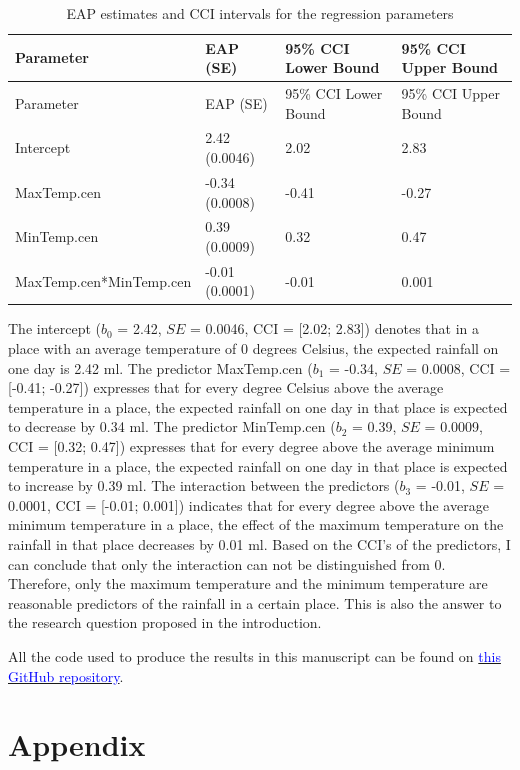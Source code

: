 \documentclass[
]{article}
\begin{document}
\begin{longtable}[]{@{}llll@{}}
\caption{EAP estimates and CCI intervals for the regression
parameters}\tabularnewline
\toprule
Parameter & EAP (SE) & 95\% CCI Lower Bound & 95\% CCI Upper Bound \\
\midrule
\endfirsthead
\toprule
Parameter & EAP (SE) & 95\% CCI Lower Bound & 95\% CCI Upper Bound \\
\midrule
\endhead
Intercept & 2.42 (0.0046) & 2.02 & 2.83 \\
MaxTemp.cen & -0.34 (0.0008) & -0.41 & -0.27 \\
MinTemp.cen & 0.39 (0.0009) & 0.32 & 0.47 \\
MaxTemp.cen*MinTemp.cen & -0.01 (0.0001) & -0.01 & 0.001 \\
\bottomrule
\end{longtable}

The intercept (\(b_0\) = 2.42, \(SE\) = 0.0046, CCI = {[}2.02; 2.83{]})
denotes that in a place with an average temperature of 0 degrees
Celsius, the expected rainfall on one day is 2.42 ml. The predictor
MaxTemp.cen (\(b_1\) = -0.34, \(SE\) = 0.0008, CCI = {[}-0.41; -0.27{]})
expresses that for every degree Celsius above the average temperature in
a place, the expected rainfall on one day in that place is expected to
decrease by 0.34 ml. The predictor MinTemp.cen (\(b_2\) = 0.39, \(SE\) =
0.0009, CCI = {[}0.32; 0.47{]}) expresses that for every degree above
the average minimum temperature in a place, the expected rainfall on one
day in that place is expected to increase by 0.39 ml. The interaction
between the predictors (\(b_3\) = -0.01, \(SE\) = 0.0001, CCI =
{[}-0.01; 0.001{]}) indicates that for every degree above the average
minimum temperature in a place, the effect of the maximum temperature on
the rainfall in that place decreases by 0.01 ml. Based on the CCI's of
the predictors, I can conclude that only the interaction can not be
distinguished from 0. Therefore, only the maximum temperature and the
minimum temperature are reasonable predictors of the rainfall in a
certain place. This is also the answer to the research question proposed
in the introduction.

All the code used to produce the results in this manuscript can be found
on
\href{https://github.com/jakkermans}{\textcolor{blue}{this GitHub repository}}.

\newpage

\hypertarget{appendix}{%
\section{Appendix}\label{appendix}}
\end{document}
